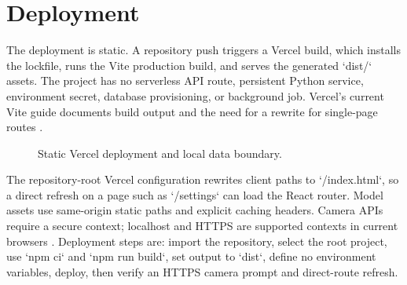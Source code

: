\documentclass[11pt,oneside,openany]{report}
\begin{document}
\chapter{Deployment}
The deployment is static. A repository push triggers a Vercel build, which installs the lockfile, runs the Vite production build, and serves the generated `dist/` assets. The project has no serverless API route, persistent Python service, environment secret, database provisioning, or background job. Vercel's current Vite guide documents build output and the need for a rewrite for single-page routes \cite{vercelVite}.

\begin{figure}[htbp]
\centering
{}
\caption{Static Vercel deployment and local data boundary.}
\label{fig:deployment}
\end{figure}

The repository-root Vercel configuration rewrites client paths to `/index.html`, so a direct refresh on a page such as `/settings` can load the React router. Model assets use same-origin static paths and explicit caching headers. Camera APIs require a secure context; localhost and HTTPS are supported contexts in current browsers \cite{getUserMedia}. Deployment steps are: import the repository, select the root project, use `npm ci` and `npm run build`, set output to `dist`, define no environment variables, deploy, then verify an HTTPS camera prompt and direct-route refresh.
\end{document}
